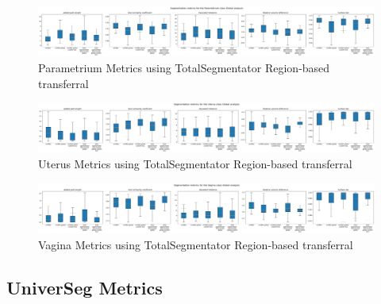 \documentclass[11pt,twoside]{report}
\begin{document}
\begin{landscape}
  \begin{figure}[H]
    \centering
    \includegraphics[width=\linewidth]{../../research/source/code/data/metrics/metricsparametrium_1_combinednotable_Global_analysis.png}
    \caption{Parametrium Metrics using TotalSegmentator Region-based transferral}\label{fig:region-based-metrics-parametrium}
  \end{figure}

  \begin{figure}[H]
    \centering
    \includegraphics[width=\linewidth]{../../research/source/code/data/metrics/metricsuterus_1_combinednotable_Global_analysis.png}
    \caption{Uterus Metrics using TotalSegmentator Region-based transferral}\label{fig:region-based-metrics-uterus}
  \end{figure}

  \begin{figure}[H]
    \centering
    \includegraphics[width=\linewidth]{../../research/source/code/data/metrics/metricsvagina_1_combinednotable_Global_analysis.png}
    \caption{Vagina Metrics using TotalSegmentator Region-based transferral}\label{fig:region-based-metrics-vagina}
  \end{figure}

\end{landscape}

\subsection{UniverSeg Metrics}\label{sect:universeg-Appendix}
\end{document}
